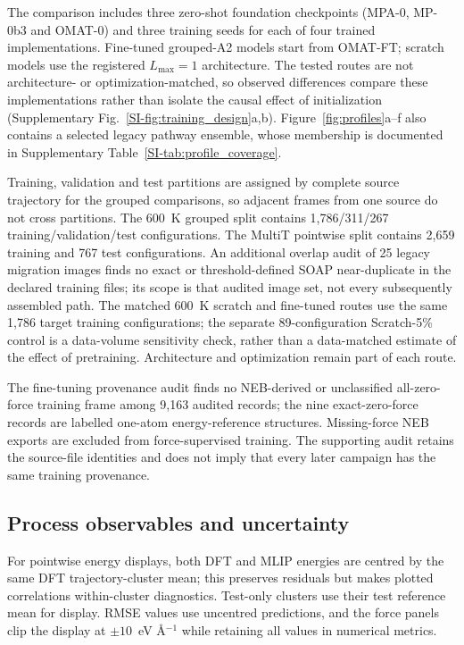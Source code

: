 \documentclass[pdflatex,sn-mathphys-num]{sn-jnl}
\newif\ifreviewcopy
\newcommand{\rev}[2]{\ifreviewcopy{\color{revisionblue}#2\textsuperscript{\scriptsize[R1-#1]}}\else#2\fi}
\begin{document}
The comparison includes three zero-shot foundation checkpoints (MPA-0, MP-0b3 and OMAT-0) and three training seeds for each of four trained implementations. Fine-tuned grouped-A2 models start from OMAT-FT; scratch models use the registered $L_{\max}=1$ architecture. The tested routes are not architecture- or optimization-matched, so observed differences compare these implementations rather than isolate the causal effect of initialization (Supplementary Fig.~\ref{SI-fig:training_design}a,b). Figure~\ref{fig:profiles}a--f also contains a selected legacy pathway ensemble, whose membership is documented in Supplementary Table~\ref{SI-tab:profile_coverage}.

\rev{C10}{Training, validation and test partitions are assigned by complete source trajectory for the grouped comparisons, so adjacent frames from one source do not cross partitions.} The 600~K grouped split contains 1,786/311/267 training/validation/test configurations. The MultiT pointwise split contains 2,659 training and 767 test configurations. \rev{A2}{An additional overlap audit of 25 legacy migration images finds no exact or threshold-defined SOAP near-duplicate in the declared training files; its scope is that audited image set, not every subsequently assembled path.} \rev{A5}{The matched 600~K scratch and fine-tuned routes use the same 1,786 target training configurations; the separate 89-configuration Scratch-5\% control is a data-volume sensitivity check, rather than a data-matched estimate of the effect of pretraining.} Architecture and optimization remain part of each route.

\rev{C8}{The fine-tuning provenance audit finds no NEB-derived or unclassified all-zero-force training frame among 9,163 audited records; the nine exact-zero-force records are labelled one-atom energy-reference structures.} Missing-force NEB exports are excluded from force-supervised training. The supporting audit retains the source-file identities and does not imply that every later campaign has the same training provenance.

\subsection{Process observables and uncertainty}\label{sec:operators}
For pointwise energy displays, both DFT and MLIP energies are centred by the same DFT trajectory-cluster mean; this preserves residuals but makes plotted correlations within-cluster diagnostics. Test-only clusters use their test reference mean for display. RMSE values use uncentred predictions, and the force panels clip the display at $\pm10$~eV \AA$^{-1}$ while retaining all values in numerical metrics.
\end{document}
